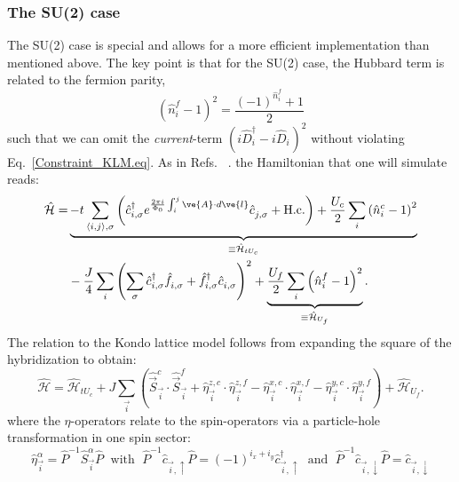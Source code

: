 \subsubsection*{ The SU(2) case } 
The SU(2) case is special and allows for a more efficient implementation than  mentioned above.    The  key point is that  for the SU(2) case, the  Hubbard term is  related to  the fermion parity,
\begin{equation} 
   \left(   \hat{n}^f_i - 1 \right)^2    = \frac{  (-1)^{\hat{n}^f_i}  +1 }{2}
\end{equation}
such that we can omit the \textit{current}-term  $ \left(  i\hat{D}^{\dagger}_{i}  - i  \hat{D}^{\phantom\dagger}_{i}    \right)^2 $    without violating  Eq.~\ref{Constraint_KLM.eq}.  
As in Refs.~ \cite{Assaad99a,Capponi00,Beach04}.  
the Hamiltonian that one will simulate reads: 
 \begin{align}
 \label{eqn:ham_kondo}
 	\hat{\mathcal{H}}  = &
	\underbrace{-t \sum_{\langle i,j \rangle,\sigma} \left( \hat{c}_{i,\sigma}^{\dagger} e^{\frac{2\pi i}{\Phi_0}  \int_{i}^{j} \ve{A}\cdot d \ve{l}} \hat{c}_{j,\sigma}^{\phantom\dagger}   + \text{H.c.} \right) +
	  \frac{U_c}{2}   \sum_{i}   \left( \hat{n}^{c}_{i} -1 \right)^2    }_{\equiv \hat{\mathcal{H}}_{tU_c}}     \nonumber \\   & -  \frac{J}{4} 
	\sum_{i} \left( \sum_{\sigma} \hat{c}_{i,\sigma}^{\dagger}  \hat{f}_{i,\sigma}^{\phantom\dagger}  + 
	                                                        \hat{f}_{i,\sigma}^{\dagger}  \hat{c}_{i,\sigma}^{\phantom\dagger}   \right)^{2}   +
        \underbrace{\frac{U_f}{2}   \sum_{i}   \left( \hat{n}^{f}_{i} -1 \right)^2}_{\equiv \hat{\mathcal{H}}_{U_f}}.
 \end{align}
The  relation to the Kondo lattice model follows  from expanding the square  of the hybridization to obtain: 
 \begin{equation}
 	\hat{\mathcal{H}}  =\hat{\mathcal{H}}_{tU_c}   
	+ J \sum_{\vec{i}}  \left(  \hat{\vec{S}}^{c}_{\vec{i}} \cdot  \hat{\vec{S}}^{f}_{\vec{i}}    +   \hat{\eta}^{z,c}_{\vec{i}} \cdot  \hat{\eta}^{z,f}_{\vec{i}}  
		-  \hat{\eta}^{x,c}_{\vec{i}} \cdot  \hat{\eta}^{x,f}_{\vec{i}}  -  \hat{\eta}^{y,c}_{\vec{i}} \cdot  \hat{\eta}^{y,f}_{\vec{i}} \right) 
	 + \hat{\mathcal{H}}_{U_f}.
 \end{equation}
 where the $\eta$-operators  relate to the spin-operators via a particle-hole transformation in one spin sector: 
 \begin{equation} 
 	\hat{\eta}^{\alpha}_{\vec{i}}  = \hat{P}^{-1}  \hat{S}^{\alpha}_{\vec{i}} \hat{P}  	\; \text{ with }  \;   
	\hat{P}^{-1}  \hat{c}^{\phantom\dagger}_{\vec{i},\uparrow} \hat{P}  =   (-1)^{i_x+i_y} \hat{c}^{\dagger}_{\vec{i},\uparrow}  \; \text{ and }  \;   
	\hat{P}^{-1}  \hat{c}^{\phantom\dagger}_{\vec{i},\downarrow} \hat{P}  = \hat{c}^{\phantom\dagger}_{\vec{i},\downarrow} 
 \end{equation}
